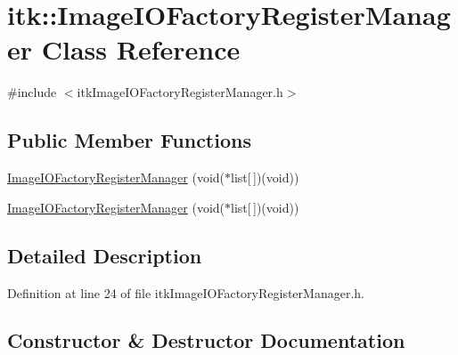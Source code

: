 \hypertarget{classitk_1_1_image_i_o_factory_register_manager}{}\section{itk\+:\+:Image\+I\+O\+Factory\+Register\+Manager Class Reference}
\label{classitk_1_1_image_i_o_factory_register_manager}


{\ttfamily \#include $<$itk\+Image\+I\+O\+Factory\+Register\+Manager.\+h$>$}

\subsection*{Public Member Functions}
\begin{DoxyCompactItemize}
\item 
\hyperlink{classitk_1_1_image_i_o_factory_register_manager_aed949d5467196438d79b90abfcfb189b}{Image\+I\+O\+Factory\+Register\+Manager} (void($\ast$list\mbox{[}$\,$\mbox{]})(void))
\item 
\hyperlink{classitk_1_1_image_i_o_factory_register_manager_aed949d5467196438d79b90abfcfb189b}{Image\+I\+O\+Factory\+Register\+Manager} (void($\ast$list\mbox{[}$\,$\mbox{]})(void))
\end{DoxyCompactItemize}


\subsection{Detailed Description}


Definition at line 24 of file itk\+Image\+I\+O\+Factory\+Register\+Manager.\+h.



\subsection{Constructor \& Destructor Documentation}
\mbox{\label{classitk_1_1_image_i_o_factory_register_manager_aed949d5467196438d79b90abfcfb189b}} 
